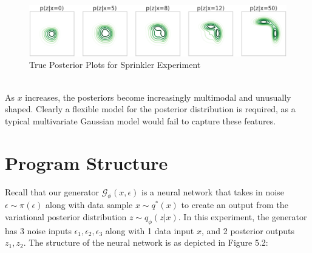 \documentclass[honours,12pt]{unswthesis}
\numberwithin{equation}{section}
\theoremstyle{definition}
\begin{document}
\begin{figure}[h]
\includegraphics[width=\textwidth]{sprinklertrue.png}
\caption{True Posterior Plots for Sprinkler Experiment}
\end{figure}\\
As $x$ increases, the posteriors become increasingly multimodal and unusually shaped. Clearly a flexible model for the posterior distribution is required, as a typical multivariate Gaussian model would fail to capture these features.
\newpage
\section{Program Structure}
Recall that our generator $\mathcal{G}_\phi(x,\epsilon)$ is a neural network that takes in noise $\epsilon\sim \pi(\epsilon)$ along with data sample $x\sim q^*(x)$ to create an output from the variational posterior distribution $z\sim q_\phi(z|x)$. In this experiment, the generator has 3 noise inputs $\epsilon_1,\epsilon_2,\epsilon_3$ along with 1 data input $x$, and 2 posterior outputs $z_1, z_2$. The structure of the neural network is as depicted in Figure 5.2:
\end{document}
